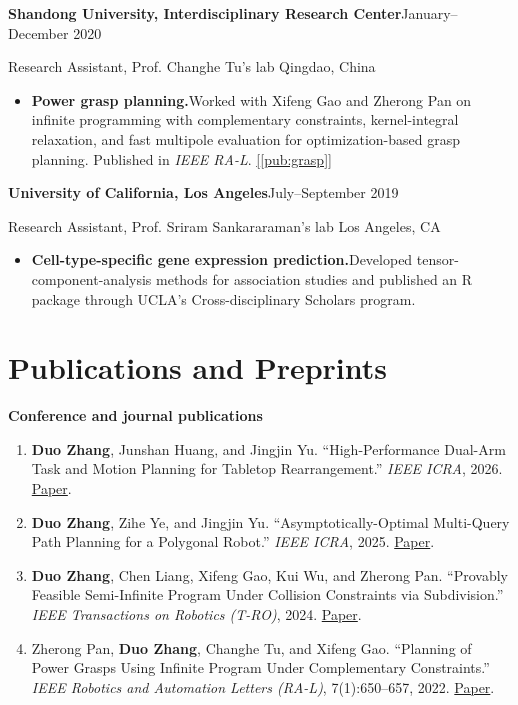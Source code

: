 \documentclass[11pt,letterpaper]{article}
\newcommand{\entry}[2]{\Needspace{6\baselineskip}\textbf{#1}\hfill #2\par}
\newcommand{\project}[2]{\item \textbf{#1}\enspace #2}
\newcommand{\paperref}[1]{\hyperref[pub:#1]{[\ref*{pub:#1}]}}
\begin{document}
\entry{Shandong University, Interdisciplinary Research Center}{January--December 2020}
Research Assistant, Prof. Changhe Tu's lab \hfill Qingdao, China
\begin{itemize}
  \project{Power grasp planning.}{Worked with Xifeng Gao and Zherong Pan on
  infinite programming with complementary constraints, kernel-integral relaxation,
  and fast multipole evaluation for optimization-based grasp planning.
  Published in \textit{IEEE RA-L}. \paperref{grasp}}
\end{itemize}

\entry{University of California, Los Angeles}{July--September 2019}
Research Assistant, Prof. Sriram Sankararaman's lab \hfill Los Angeles, CA
\begin{itemize}
  \project{Cell-type-specific gene expression prediction.}{Developed
  tensor-component-analysis methods for association studies and published an R
  package through UCLA's Cross-disciplinary Scholars program.}
\end{itemize}

\section*{Publications and Preprints}
\textbf{Conference and journal publications}
\begin{enumerate}
  \item\label{pub:sdar} \textbf{Duo Zhang}, Junshan Huang, and Jingjin Yu.
  ``High-Performance Dual-Arm Task and Motion Planning for Tabletop
  Rearrangement.'' \textit{IEEE ICRA}, 2026.
  \href{https://arxiv.org/abs/2512.08206}{Paper}.

  \item\label{pub:rvg} \textbf{Duo Zhang}, Zihe Ye, and Jingjin Yu.
  ``Asymptotically-Optimal Multi-Query Path Planning for a Polygonal Robot.''
  \textit{IEEE ICRA}, 2025.
  \href{https://arxiv.org/abs/2409.03920}{Paper}.

  \item\label{pub:sip} \textbf{Duo Zhang}, Chen Liang, Xifeng Gao, Kui Wu, and Zherong Pan.
  ``Provably Feasible Semi-Infinite Program Under Collision Constraints via
  Subdivision.'' \textit{IEEE Transactions on Robotics (T-RO)}, 2024.
  \href{https://ieeexplore.ieee.org/abstract/document/10505800}{Paper}.

  \item\label{pub:grasp} Zherong Pan, \textbf{Duo Zhang}, Changhe Tu, and Xifeng Gao.
  ``Planning of Power Grasps Using Infinite Program Under Complementary
  Constraints.'' \textit{IEEE Robotics and Automation Letters (RA-L)},
  7(1):650--657, 2022.
  \href{https://doi.org/10.1109/LRA.2021.3130376}{Paper}.
\end{enumerate}
\end{document}
